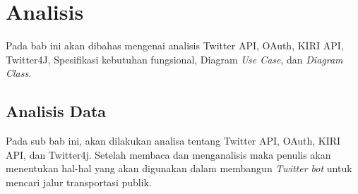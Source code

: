 \chapter{Analisis}
\label{chap:analisis}

Pada bab ini akan dibahas mengenai analisis Twitter API, OAuth, KIRI API, Twitter4J, Spesifikasi kebutuhan fungsional, Diagram \textit{Use Case}, dan \textit{Diagram Class}.

\section{Analisis Data}

Pada sub bab ini, akan dilakukan analisa tentang Twitter API, OAuth, KIRI API, dan Twitter4j. Setelah membaca dan menganalisis maka penulis akan menentukan hal-hal  yang akan digunakan dalam membangun \textit{Twitter bot} untuk mencari jalur transportasi publik.

